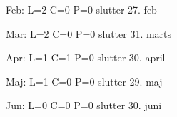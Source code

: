 Feb:    L=2     C=0     P=0      slutter 27. feb

Mar:    L=2     C=0     P=0      slutter 31. marts

Apr:    L=1     C=1     P=0      slutter 30. april

Maj:    L=1     C=0     P=0      slutter 29. maj

Jun:    L=0     C=0     P=0      slutter 30. juni